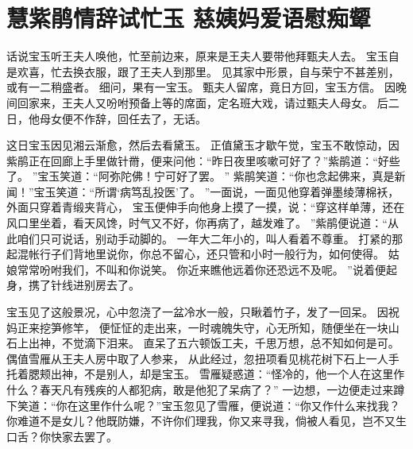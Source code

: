 \chapter{慧紫鹃情辞试忙玉 \quad 慈姨妈爱语慰痴颦}
\par
话说宝玉听王夫人唤他，忙至前边来，原来是王夫人要带他拜甄夫人去。
宝玉自是欢喜，忙去换衣服，跟了王夫人到那里。
见其家中形景，自与荣宁不甚差别，或有一二稍盛者。
细问，果有一宝玉。
甄夫人留席，竟日方回，宝玉方信。
因晚间回家来，王夫人又吩咐预备上等的席面，定名班大戏，请过甄夫人母女。
后二日，他母女便不作辞，回任去了，无话。
\par
这日宝玉因见湘云渐愈，然后去看黛玉。
正值黛玉才歇午觉，宝玉不敢惊动，因紫鹃正在回廊上手里做针黹，便来问他：“昨日夜里咳嗽可好了？”紫鹃道：“好些了。
”宝玉笑道：“阿弥陀佛！宁可好了罢。
”
紫鹃笑道：“你也念起佛来，真是新闻！”宝玉笑道：“所谓‘病笃乱投医’了。
”一面说，一面见他穿着弹墨绫薄棉袄，
外面只穿着青缎夹背心，
宝玉便伸手向他身上摸了一摸，说：“穿这样单薄，还在风口里坐着，看天风馋，时气又不好，你再病了，越发难了。
”紫鹃便说道：“从此咱们只可说话，别动手动脚的。
一年大二年小的，叫人看着不尊重。
打紧的那起混帐行子们背地里说你，你总不留心，还只管和小时一般行为，如何使得。
姑娘常常吩咐我们，不叫和你说笑。
你近来瞧他远着你还恐远不及呢。
”说着便起身，携了针线进别房去了。
\par
宝玉见了这般景况，心中忽浇了一盆冷水一般，只瞅着竹子，发了一回呆。
因祝妈正来挖笋修竿，
便怔怔的走出来，一时魂魄失守，心无所知，随便坐在一块山石上出神，不觉滴下泪来。
直呆了五六顿饭工夫，千思万想，总不知如何是可。
偶值雪雁从王夫人房中取了人参来，
从此经过，忽扭项看见桃花树下石上一人手托着腮颊出神，不是别人，却是宝玉。
雪雁疑惑道：“怪冷的，他一个人在这里作什么？春天凡有残疾的人都犯病，敢是他犯了呆病了？”
一边想，一边便走过来蹲下笑道：“你在这里作什么呢？”宝玉忽见了雪雁，便说道：“你又作什么来找我？你难道不是女儿？他既防嫌，不许你们理我，你又来寻我，倘被人看见，岂不又生口舌？你快家去罢了。
